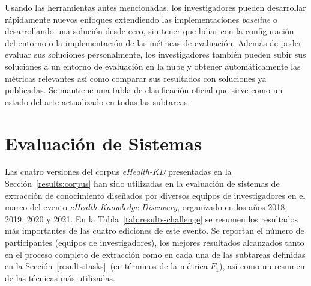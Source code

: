 Usando las herramientas antes mencionadas, los investigadores pueden desarrollar rápidamente nuevos enfoques extendiendo las implementaciones \textit{baseline} o desarrollando una solución desde cero, sin tener que lidiar con la configuración del entorno o la implementación de las métricas de evaluación.
Además de poder evaluar sus soluciones personalmente, los investigadores también pueden subir sus soluciones a un entorno de evaluación en la nube y obtener automáticamente las métricas relevantes así como comparar sus resultados con soluciones ya publicadas.
Se mantiene una tabla de clasificación oficial que sirve como un estado del arte actualizado en todas las subtareas.

\section{Evaluación de Sistemas}\label{results:challenge}

Las cuatro versiones del corpus \textit{eHealth-KD} presentadas en la Sección~\ref{results:corpus} han sido utilizadas en la evaluación de sistemas de extracción de conocimiento diseñados por diversos equipos de investigadores en el marco del evento \textit{eHealth Knowledge Discovery}, organizado en los años 2018, 2019, 2020 y 2021.
En la Tabla~\ref{tab:results-challenge} se resumen los resultados más importantes de las cuatro ediciones de este evento.
Se reportan el número de participantes (equipos de investigadores), los mejores resultados alcanzados tanto en el proceso completo de extracción como en cada una de las subtareas definidas en la Sección~\ref{results:tasks}~(en términos de la métrica $F_1$), así como un resumen de las técnicas más utilizadas.

